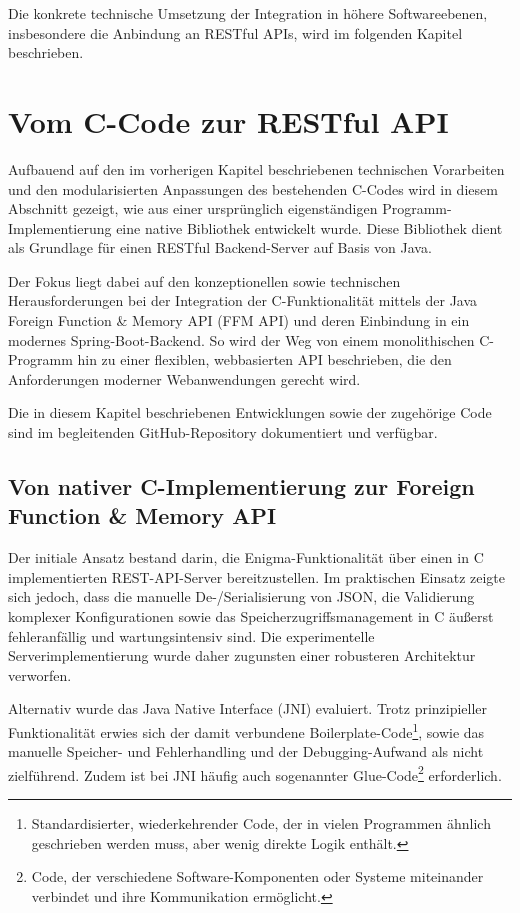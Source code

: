 \documentclass[12pt, ngerman, a4paper, numbers=noenddot]{article}
\begin{document}
Die konkrete technische Umsetzung der Integration in höhere Softwareebenen, insbesondere die Anbindung an RESTful APIs, wird im folgenden Kapitel beschrieben.

 
\newpage


\section{Vom C-Code zur RESTful API}

Aufbauend auf den im vorherigen Kapitel beschriebenen technischen Vorarbeiten und den modularisierten Anpassungen des bestehenden C-Codes wird in diesem Abschnitt gezeigt, wie aus einer ursprünglich eigenständigen Programm-Implementierung eine native Bibliothek entwickelt wurde. Diese Bibliothek dient als Grundlage für einen RESTful Backend-Server auf Basis von Java.

Der Fokus liegt dabei auf den konzeptionellen sowie technischen Herausforderungen bei der Integration der C-Funktionalität mittels der Java Foreign Function \& Memory API (FFM API) und deren Einbindung in ein modernes Spring-Boot-Backend. So wird der Weg von einem monolithischen C-Programm hin zu einer flexiblen, webbasierten API beschrieben, die den Anforderungen moderner Webanwendungen gerecht wird.

Die in diesem Kapitel beschriebenen Entwicklungen sowie der zugehörige Code sind im begleitenden GitHub-Repository dokumentiert und verfügbar\autocite{steidle2025enigmaapi}.

\subsection{Von nativer C-Implementierung zur Foreign Function \& Memory API}
\label{subsec:ffm_evolution}

Der initiale Ansatz bestand darin, die Enigma-Funktionalität über einen in C implementierten REST-API-Server bereitzustellen. Im praktischen Einsatz zeigte sich jedoch, dass die manuelle De-/Serialisierung von JSON, die Validierung komplexer Konfigurationen sowie das Speicherzugriffsmanagement in C äußerst fehleranfällig und wartungsintensiv sind. Die experimentelle Serverimplementierung wurde daher zugunsten einer robusteren Architektur verworfen.

Alternativ wurde das Java Native Interface (JNI) evaluiert. Trotz prinzipieller Funktionalität erwies sich der damit verbundene Boilerplate-Code\footnote{Standardisierter, wiederkehrender Code, der in vielen Programmen ähnlich geschrieben werden muss, aber wenig direkte Logik enthält.}, sowie das manuelle Speicher- und Fehlerhandling und der Debugging-Aufwand als nicht zielführend. Zudem ist bei JNI häufig auch sogenannter Glue-Code\footnote{Code, der verschiedene Software-Komponenten oder Systeme miteinander verbindet und ihre Kommunikation ermöglicht.} erforderlich.
\end{document}
